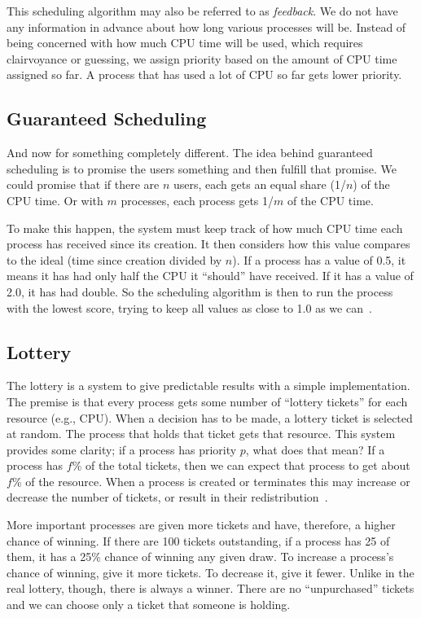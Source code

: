 This scheduling algorithm may also be referred to as \textit{feedback}. We do not have any information in advance about how long various processes will be. Instead of being concerned with how much CPU time will be used, which requires clairvoyance or guessing, we assign priority based on the amount of CPU time assigned so far. A process that has used a lot of CPU so far gets lower priority.

\subsection*{Guaranteed Scheduling}

And now for something completely different. The idea behind guaranteed scheduling is to promise the users something and then fulfill that promise. We could promise that if there are $n$ users, each gets an equal share (1/$n$) of the CPU time. Or with $m$ processes, each process gets 1/$m$ of the CPU time.

To make this happen, the system must keep track of how much CPU time each process has received since its creation. It then considers how this value compares to the ideal (time since creation divided by $n$). If a process has a value of 0.5, it means it has had only half the CPU it ``should'' have received. If it has a value of 2.0, it has had double. So the scheduling algorithm is then to run the process with the lowest score, trying to keep all values as close to 1.0 as we can~\cite{mos}.

\subsection*{Lottery}

The lottery is a system to give predictable results with a simple implementation. The premise is that every process gets some number of ``lottery tickets'' for each resource (e.g., CPU). When a decision has to be made, a lottery ticket is selected at random. The process that holds that ticket gets that resource. This system provides some clarity; if a process has priority $p$, what does that mean? If a process has $f$\% of the total tickets, then we can expect that process to get about $f$\% of the resource. When a process is created or terminates this may increase or decrease the number of tickets, or result in their redistribution~\cite{mos}. 

More important processes are given more tickets and have, therefore, a higher chance of winning. If there are 100 tickets outstanding, if a process has 25 of them, it has a 25\% chance of winning any given draw. To increase a process's chance of winning, give it more tickets. To decrease it, give it fewer. Unlike in the real lottery, though, there is always a winner. There are no ``unpurchased'' tickets and we can choose only a ticket that someone is holding.

